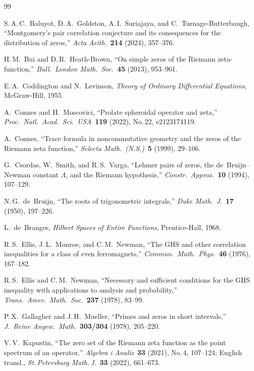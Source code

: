 \documentclass[11pt,a4paper]{amsart}
\theoremstyle{definition}
\theoremstyle{remark}
\begin{document}
\begin{thebibliography}{99}

 S.\,A.\,C.~Baluyot, D.\,A.~Goldston, A.\,I.~Suriajaya, and C.~Turnage-Butterbaugh, ``Montgomery's pair correlation conjecture and its consequences for the distribution of zeros,'' \emph{Acta Arith.}~\textbf{214} (2024), 357--376.

 H.\,M.~Bui and D.\,R.~Heath-Brown, ``On simple zeros of the Riemann zeta-function,'' \emph{Bull.\ London Math.\ Soc.}~\textbf{45} (2013), 953--961.

 E.\,A.~Coddington and N.~Levinson, \emph{Theory of Ordinary Differential Equations}, McGraw-Hill, 1955.

 A.~Connes and H.~Moscovici, ``Prolate spheroidal operator and zeta,'' \emph{Proc.\ Natl.\ Acad.\ Sci.\ USA}~\textbf{119} (2022), No.\,22, e2123174119.

 A.~Connes, ``Trace formula in noncommutative geometry and the zeros of the Riemann zeta function,'' \emph{Selecta Math.\ (N.S.)}~\textbf{5} (1999), 29--106.

 G.~Csordas, W.~Smith, and R.\,S.~Varga, ``Lehmer pairs of zeros, the de~Bruijn--Newman constant $\Lambda$, and the Riemann hypothesis,'' \emph{Constr.\ Approx.}~\textbf{10} (1994), 107--129.

 N.\,G.~de~Bruijn, ``The roots of trigonometric integrals,'' \emph{Duke Math.\ J.}~\textbf{17} (1950), 197--226.

 L.~de~Branges, \emph{Hilbert Spaces of Entire Functions}, Prentice-Hall, 1968.

 R.\,S.~Ellis, J.\,L.~Monroe, and C.\,M.~Newman, ``The GHS and other correlation inequalities for a class of even ferromagnets,'' \emph{Commun.\ Math.\ Phys.}~\textbf{46} (1976), 167--182.

 R.\,S.~Ellis and C.\,M.~Newman, ``Necessary and sufficient conditions for the GHS inequality with applications to analysis and probability,'' \emph{Trans.\ Amer.\ Math.\ Soc.}~\textbf{237} (1978), 83--99.

 P.\,X.~Gallagher and J.\,H.~Mueller, ``Primes and zeros in short intervals,'' \emph{J.\ Reine Angew.\ Math.}~\textbf{303/304} (1978), 205--220.

 V.\,V.~Kapustin, ``The zero set of the Riemann zeta function as the point spectrum of an operator,'' \emph{Algebra i Analiz}~\textbf{33} (2021), No.\,4, 107--124; English transl., \emph{St.\,Petersburg Math.\,J.}~\textbf{33} (2022), 661--673.


\end{thebibliography}
\end{document}
